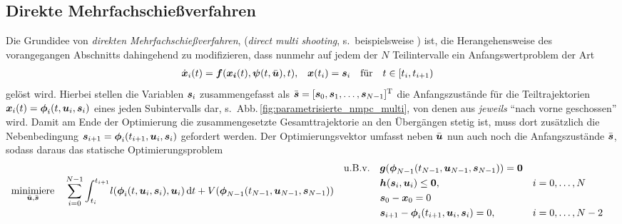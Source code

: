 \subsection{Direkte Mehrfachschießverfahren} \label{sec:direkte_mehrfach_schiessverfahren}
Die Grundidee von \emph{direkten Mehrfachschießverfahren}, (\emph{direct multi shooting}, s.\ beispielsweise \cite{diehl_fast_multipleshooting, papageorgiou2012optimierung, graichen2014SkriptOpt}) ist, die Herangehensweise des vorangegangen Abschnitts dahingehend zu modifizieren, dass nunmehr auf jedem der $N$ Teilintervalle ein Anfangswertproblem der Art
\begin{align*}
	\dot{\boldsymbol{x}}_i(t) = \boldsymbol{f}(\boldsymbol{x_i}(t),\boldsymbol{\psi}(t,\bar{\boldsymbol{u}}),t), \quad &\boldsymbol{x}(t_i) = \boldsymbol{s}_i \quad \text{für} \quad t \in [t_i, t_{i+1})
\end{align*}
gelöst wird. Hierbei stellen die Variablen $\boldsymbol{s}_i$ zusammengefasst als $\bar{\boldsymbol{s}} = [\boldsymbol{s}_0, \boldsymbol{s}_1, \ldots, \boldsymbol{s}_{N-1}]^{{\rm T}}$ die Anfangszustände für die Teiltrajektorien $\boldsymbol{x}_i(t) = \boldsymbol{\phi}_i(t,\boldsymbol{u}_i,\boldsymbol{s}_i)$ eines jeden Subintervalls dar, s.\ Abb.\,\ref{fig:parametrisierte_nmpc_multi}, von denen aus \emph{jeweils} "`nach vorne geschossen"' wird. Damit am Ende der Optimierung die zusammengesetzte Gesamttrajektorie an den Übergängen stetig ist, muss dort zusätzlich die Nebenbedingung $\boldsymbol{s}_{i+1} = \boldsymbol{\phi}_i(t_{i+1},\boldsymbol{u}_i,\boldsymbol{s}_i)$  gefordert werden. Der Optimierungsvektor umfasst neben $\bar{\boldsymbol{u}}$ nun auch noch die Anfangszustände $\bar{\boldsymbol{s}}$, sodass daraus das statische Optimierungsproblem \cite{papageorgiou2012optimierung, graichen2014SkriptOpt}
\begin{subequations}
\begin{align*}
	\underset{\bar{\bs{u}}, \bar{\bs{s}}}{\text{minimiere}}  \quad & %
	\sum_{i=0}^{N-1}{\int_{t_i}^{t_{i+1}}} l(\bs{\phi}_i(t,\bs{u}_i,\bs{s}_i),\bs{u}_i)\,{\rm d} t + V(\bs{\phi}_{N-1}(t_{N-1},\bs{u}_{N-1},\bs{s}_{N-1}))
\end{align*}
\begin{align*}
	\text{u.B.v.} \quad &\bs{g}(\bs{\phi}_{N-1}(t_{N-1},\bs{u}_{N-1},\bs{s}_{N-1})) = \bs{0}\\ 	
	&\bs{h}(\bs{s}_i,\bs{u}_i) \leq \bs{0},  & i&=0,\ldots,N \\
	&\bs{s}_0 - \bs{x}_0 = 0 \\
	&\bs{s}_{i+1} - \bs{\phi}_i(t_{i+1},\bs{u}_i,\bs{s}_i) = 0, & i&=0, \ldots,N-2
\end{align*} 
\end{subequations}
